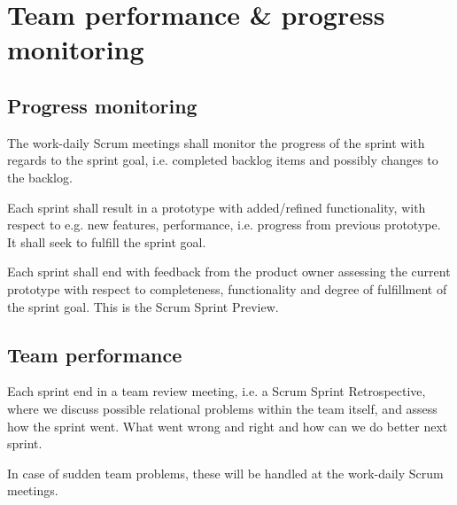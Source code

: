 \section{Team performance \& progress monitoring}

\subsection{Progress monitoring}
The work-daily Scrum meetings shall monitor the progress of the sprint with regards to the sprint goal, i.e. completed backlog items and possibly changes to the backlog.

Each sprint shall result in a prototype with added/refined functionality, with respect to e.g. new features, performance, i.e. progress from previous prototype. It shall seek to fulfill the sprint goal.

Each sprint shall end with feedback from the product owner assessing the current prototype with respect to completeness, functionality and degree of fulfillment of the sprint goal. This is the Scrum Sprint Preview.

\subsection{Team performance}
Each sprint end in a team review meeting, i.e. a Scrum Sprint Retrospective, where we discuss possible relational problems within the team itself, and assess how the sprint went. What went wrong and right and how can we do better next sprint.

In case of sudden team problems, these will be handled at the work-daily Scrum meetings.